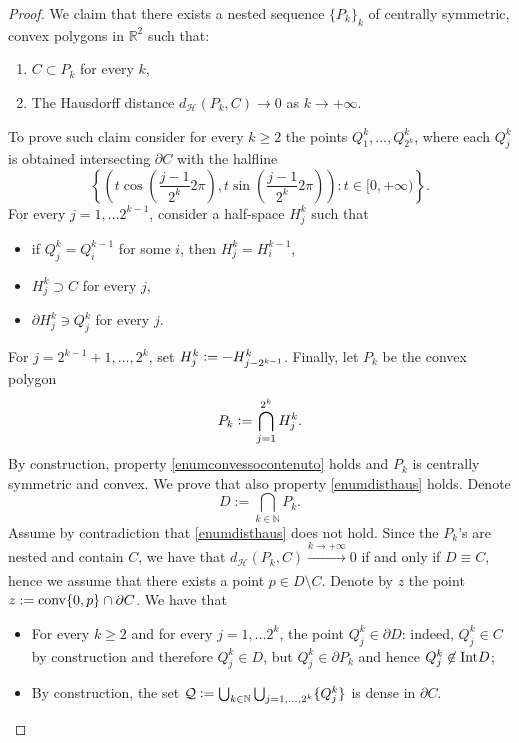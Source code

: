 \documentclass{article}
\numberwithin{equation}{section}
\theoremstyle{plain}%
\theoremstyle{definition}
\theoremstyle{definition}
\newcommand{\rgrande}{\mathbb{R}}
\newcommand{\ngrande}{\mathbb{N}}
\newcommand{\haus}{\mathcal{H}}
\newcommand{\conv}{{\rm conv}}
\newcommand{\interno}{{\rm Int}}
\begin{document}
\begin{proof}
We claim that there exists a nested sequence $\{P_k \}_k$ of centrally symmetric, convex polygons in $\rgrande^2$ such that:
\begin{enumerate}
    \item\label{enumconvessocontenuto} $C \subset P_k$ for every $k$,
    \item\label{enumdisthaus} The Hausdorff distance $d_{\haus} (P_k,C) \longrightarrow 0$ as $k \to + \infty$.
\end{enumerate}
To prove such claim consider for every $k\geq 2$ the points $Q^k_1,\dots,Q^k_{2^k}$, where each $Q^k_j$ is obtained intersecting $\partial C$ with the halfline
$$
\left\{\left(t\cos\left(\frac{j-1}{2^k}2\pi\right),t\sin\left(\frac{j-1}{2^k}2\pi\right)\right) : t \in [0, + \infty)\right\}
\text{.}
$$
For every $j=1,\ldots 2^{k-1}$, consider a half-space $H^k_j$ such that
\begin{itemize}
    \item if $Q^k_j=Q^{k-1}_i$ for some $i$, then $H^k_j=H^{k-1}_i$,
    \item $H^k_j\supset C$ for every $j$,
    \item $\partial H^k_j\ni Q^k_j$ for every $j$.
\end{itemize}

For $j=2^{k-1}+1,\ldots, 2^{k}$, set $H^k_j \vcentcolon=-H^k_{j-2^{k-1}}$.
Finally, let ${P}_k$ be the convex polygon
$${P}_k \vcentcolon =\bigcap_{j=1}^{2^k}H^k_j
\text{.}
$$
By construction, property \ref{enumconvessocontenuto} holds and ${P}_k$ is centrally symmetric and convex. We prove that also property \ref{enumdisthaus} holds. Denote
$$
D:=\bigcap_{k\in\ngrande}P_k
\text{.}
$$
Assume by contradiction that \ref{enumdisthaus} does not hold. Since the $P_k$'s are nested and contain $C$, we have that $d_{\haus} (P_k,C) \xrightarrow[]{k \to + \infty} 0$ if and only if $D \equiv C$, hence we assume that there exists a point $p\in D\setminus C$. Denote by $z$ the point $z:=\conv \{0,p \} \cap \partial C$. We have that
\begin{itemize}
    \item For every $k\geq 2$ and for every $j=1,\dots 2^k$, the point $Q^k_j\in \partial D$: indeed, $Q^k_j\in C$ by construction and therefore $Q^k_j\in D$, but $Q^k_j\in\partial P_k$ and hence $Q^k_j\not\in \interno D$;
    \item By construction, the set $\mathcal{Q} \vcentcolon = \bigcup_{k \in \ngrande} \bigcup_{j = 1, \ldots, 2^k}\{ Q^k_j\}$ is dense in $\partial C$.
\end{itemize}


\end{proof}
\end{document}
